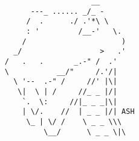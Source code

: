 \documentclass{article}
\begin{document}
\vfill
\centering
\begin{BVerbatim}
                         __
           ---_ ...... _/_ -
          /  .      ./ .'*\ \
          : '         /__-'   \.
         /                      )
       _/                  >   .'
     /   .   .       _.-" /  .'
     \           __/"     /.'/|
       \ '--  .-" /     //' |\|
        \|  \ | /     //_ _ |/|
         `.  \:     //|_ _ _|\|
         | \/.    //  | _ _ |/| ASH
          \_ | \/ /    \ _ _ \\\
              \__/      \ _ _ \|\
\end{BVerbatim}
\end{document}
